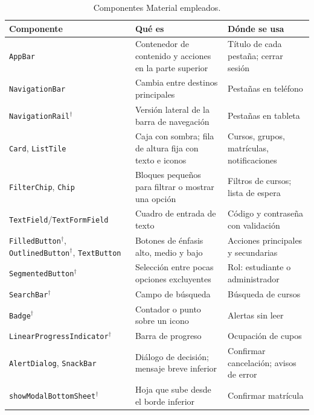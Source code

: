 \begin{table}[H]
	\centering\footnotesize
	\begin{tabularx}{\textwidth}{|p{3.2cm}|X|X|}
		\hline
		\rowcolor{tablebackground}\color{white}\textbf{Componente} & \color{white}\textbf{Qué es \cite{fluttermaterial}} & \color{white}\textbf{Dónde se usa}\\
		\hline
		\texttt{AppBar} & Contenedor de contenido y acciones en la parte superior & Título de cada pestaña; cerrar sesión \\\hline
		\texttt{NavigationBar} & Cambia entre destinos principales & Pestañas en teléfono \\\hline
		\texttt{NavigationRail}$^\dagger$ & Versión lateral de la barra de navegación & Pestañas en tableta \\\hline
		\texttt{Card}, \texttt{ListTile} & Caja con sombra; fila de altura fija con texto e iconos & Cursos, grupos, matrículas, notificaciones \\\hline
		\texttt{FilterChip}, \texttt{Chip} & Bloques pequeños para filtrar o mostrar una opción & Filtros de cursos; lista de espera \\\hline
		\texttt{TextField}/\texttt{TextFormField} & Cuadro de entrada de texto & Código y contraseña con validación \\\hline
		\texttt{FilledButton}$^\dagger$, \texttt{OutlinedButton}$^\dagger$, \texttt{TextButton} & Botones de énfasis alto, medio y bajo & Acciones principales y secundarias \\\hline
		\texttt{SegmentedButton}$^\dagger$ & Selección entre pocas opciones excluyentes & Rol: estudiante o administrador \\\hline
		\texttt{SearchBar}$^\dagger$ & Campo de búsqueda & Búsqueda de cursos \\\hline
		\texttt{Badge}$^\dagger$ & Contador o punto sobre un icono & Alertas sin leer \\\hline
		\texttt{LinearProgressIndicator}$^\dagger$ & Barra de progreso & Ocupación de cupos \\\hline
		\texttt{AlertDialog}, \texttt{SnackBar} & Diálogo de decisión; mensaje breve inferior & Confirmar cancelación; avisos de error \\\hline
		\texttt{showModalBottomSheet}$^\dagger$ & Hoja que sube desde el borde inferior & Confirmar matrícula \\\hline
	\end{tabularx}
	\caption{Componentes Material empleados.}
	\label{tab:material}
\end{table}

